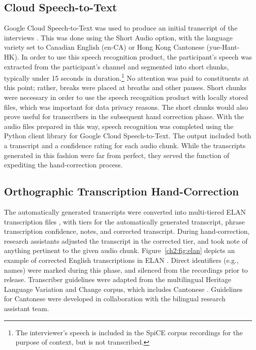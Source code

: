 \subsection{Cloud Speech-to-Text}\label{ch2:subsec:stt}
Google Cloud Speech-to-Text was used to produce an initial transcript of the interviews \citep{google_2019_stt}. This was done using the Short Audio option, with the language variety set to Canadian English (en-CA) or Hong Kong Cantonese (yue-Hant-HK). In order to use this speech recognition product, the participant's speech was extracted from the participant's channel and segmented into short chunks, typically under 15 seconds in duration.\footnote{The interviewer's speech is included in the SpiCE corpus recordings for the purpose of context, but is not transcribed.} No attention was paid to constituents at this point; rather, breaks were placed at breaths and other pauses. Short chunks were necessary in order to use the speech recognition product with locally stored files, which was important for data privacy reasons. The short chunks would also prove useful for transcribers in the subsequent hand correction phase. With the audio files prepared in this way, speech recognition was completed using the Python client library for Google Cloud Speech-to-Text. The output included both a transcript and a confidence rating for each audio chunk. While the transcripts generated in this fashion were far from perfect, they served the function of expediting the hand-correction process.

\subsection{Orthographic Transcription Hand-Correction}\label{ch2:subsec:orthographic}
The automatically generated transcripts were converted into multi-tiered ELAN transcription files \citep{sloetjes_2008_elan}, with tiers for the automatically generated transcript, phrase transcription confidence, notes, and corrected transcript. During hand-correction, research assistants adjusted the transcript in the corrected tier, and took note of anything pertinent to the given audio chunk. Figure~\ref{ch2:fig:elan} depicts an example of corrected English transcriptions in ELAN \citep{sloetjes_2008_elan}. Direct identifiers (e.g., names) were marked during this phase, and silenced from the recordings prior to release. Transcriber guidelines were adapted from the multilingual Heritage Language Variation and Change corpus, which includes Cantonese \citep{nagy_2011_hlvc}. Guidelines for Cantonese were developed in collaboration with the bilingual research assistant team.

